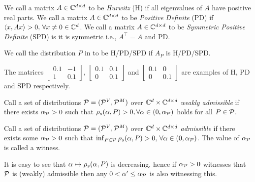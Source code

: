 \begin{definition}
We call a matrix $A\in \C^{\dcd}$ to be \emph{Hurwitz} (H) if all eigenvalues of $A$ have positive real parts. We call a matrix $A\in \C^{\dcd}$ to be \emph{Positive Definite} (PD) if $\ip{x,Ax} >0,\,\forall x\neq 0 \in \C^{d}$.  We call a matrix $A\in \C^{\dcd}$ to be \emph{Symmetric Positive Definite} (SPD) is it is symmetric i.e., $A^\top=A$ and PD.
\end{definition}
\begin{definition}\label{distpd}
We call the distribution $P$ in  to be H/PD/SPD if $A_P$ is H/PD/SPD.
\end{definition}
\begin{example}
The matrices $\begin{bmatrix}0.1 &-1\\ 1 & 0.1\end{bmatrix}$, $\begin{bmatrix} 0.1 & 0.1 \\ 0 & 0.1\end{bmatrix}$ and $\begin{bmatrix}0.1 &0 \\ 0 & 0.1\end{bmatrix}$ are examples of H, PD and SPD respectively.
\end{example}

\begin{definition}
Call a set of distributions $\P=(\P^V,\P^M)$ over $\C^{d}\times \C^{\dcd}$
\emph{weakly admissible} if there exists $\alpha_{\P}>0$ such that
$\rhos{P}>0,\forall \alpha\in(0,\alpha_{\P})$ holds for all $P\in \P$.
\end{definition}
\begin{definition}
Call a set of distributions $\P=(\P^V,\P^M)$ over $\C^{d}\times \C^{\dcd}$ \emph{admissible}
if there exists some $\alpha_{\P}>0$ such that $\inf_{P\in \P} \rhos{P}>0,\,\forall \alpha\in(0,\alpha_{\P})$.
The value of $\alpha_{\P}$ is called a witness.
\end{definition}

It is easy to see that $\alpha \mapsto \rhos{P}$ is decreasing,
hence if $\alpha_{\P}>0$ witnesses that $\P$ is (weakly) admissible
then any $0<\alpha'\le \alpha_{\P}$ is also witnessing this.
